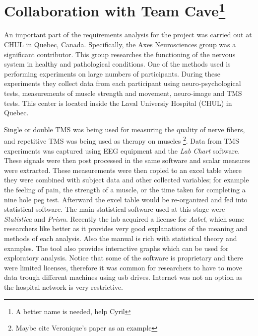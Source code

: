 
\section{Collaboration with Team Cave\footnote{A better name is needed, help Cyril}}

An important part of the requirements analysis for the project was carried out at CHUL in Quebec, Canada. Specifically, the Axes Neurosciences group was a significant contributor. This group researches the functioning of the nervous system in healthy and pathological conditions. One of the methods used is performing experiments on large numbers of participants. During these experiments they collect data from each participant using neuro-psychological tests, measurements of muscle strength and movement, neuro-image and TMS tests. This center is located inside the Laval Universiy Hospital (CHUL) in Quebec.

Single or double TMS was being used for measuring the quality of nerve fibers, and repetitive TMS was being used as therapy on muscles \footnote{Maybe cite Veronique's paper as an example}. Data from TMS experiments was captured using EEG equipment and the \emph{Lab Chart} software. These signals were then post processed in the same software and scalar measures were extracted. These measurements were then copied to an excel table where they were combined with subject data and other collected variables; for example the feeling of pain, the strength of a muscle, or the time taken for completing a nine hole peg test. Afterward the excel table would be re-organized and fed into statistical software. The main statistical software used at this stage were \emph{Statistica} and \emph{Prism}. Recently the lab acquired a license for \emph{Aabel}, which some researchers like better as it provides very good explanations of the meaning and methods of each analysis. Also the manual is rich with statistical theory and examples. The tool also provides interactive graphs which can be used for exploratory analysis. Notice that some of the software is proprietary and there were limited licenses, therefore it was common for researchers to have to move data trough different machines using usb drives. Internet was not an option as the hospital network is very restrictive.


